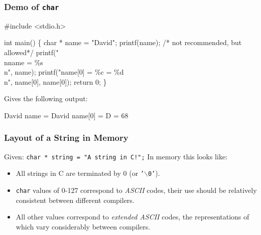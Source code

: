 \documentclass[table]{beamer}
\newif\ifschigh\schighfalse
\newcommand{\kw}[1]{\ifschigh\textcolor{red}{#1}\else\textcolor{keyword}{#1}\fi}
\newcommand{\kt}[1]{\ifschigh\textcolor{red}{#1}\else\textcolor{ctext}{#1}\fi}
\newcommand{\kc}[1]{\ifschigh\textcolor{red}{#1}\else\textcolor{comment}{#1}\fi}
\newcounter{sckll}
\newcommand{\kr}{\setcounter{sckll}{1}}
\newcommand{\kl}{}
\begin{document}
\begin{frame}[fragile]
\frametitle{Demo of {\tt char}}
\begin{semiverbatim}
\scriptsize
\kr\kl\kw{\#include} \kt{<stdio.h>}
\kl
\kl\kw{int} main()
\kl\{
\kl   \kw{char} * name = \kt{"David"};
\kl   printf(name); \kc{/* not recommended, but allowed*/}
\kl   printf(\kt{"\\nname    = \%s\\n"}, name);
\kl   printf(\kt{"name[0] = \%c = \%d\\n}", name[0], name[0]);
\kl   \kw{return} 0;
\kl\}
\end{semiverbatim}
Gives the following output:
\begin{semiverbatim}
David
name    = David
name[0] = D = 68
\end{semiverbatim}
\end{frame}

\begin{frame}
\frametitle{Layout of a String in Memory}
Given: {\tt \kw{char} * string = \kt{"A string in C!"};}
In memory this looks like:
\begin{center}
\end{center}
\begin{itemize}
\item All strings in C are terminated by 0 (or {\tt \kt{'$\backslash$0'}}).
\item {\tt \kw{char}} values of 0-127 correspond to \emph{ASCII} codes, their use should be relatively consistent between different compilers.
\item All other values correspond to \emph{extended ASCII} codes, the representations of which vary considerably between compilers.
\end{itemize}
\end{frame}
\end{document}

